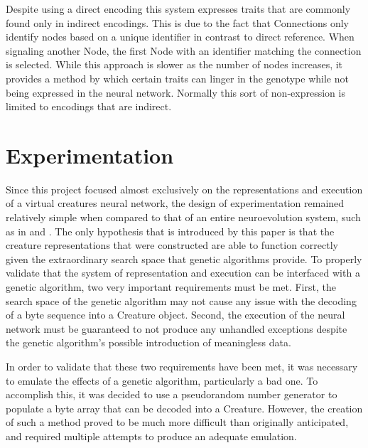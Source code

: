\documentclass[12pt]{article}
\begin{document}
Despite using a direct encoding this system expresses traits that are commonly found only in indirect encodings.
This is due to the fact that Connections only identify nodes based on a unique identifier in contrast to direct reference.
When signaling another Node, the first Node with an identifier matching the connection is selected.
While this approach is slower as the number of nodes increases, it provides a method by which certain traits can linger in the genotype while not being expressed in the neural network.
Normally this sort of non-expression is limited to encodings that are indirect.


\section*{Experimentation}
Since this project focused almost exclusively on the representations and execution of a virtual creatures neural network, the design of experimentation remained relatively simple when compared to that of an entire neuroevolution system, such as in \cite{sims1994evolving} and \cite{lehman2011evolving}.
The only hypothesis that is introduced by this paper is that the creature representations that were constructed are able to function correctly given the extraordinary search space that genetic algorithms provide.
To properly validate that the system of representation and execution can be interfaced with a genetic algorithm, two very important requirements must be met.
First, the search space of the genetic algorithm may not cause any issue with the decoding of a byte sequence into a Creature object.
Second, the execution of the neural network must be guaranteed to not produce any unhandled exceptions despite the genetic algorithm’s possible introduction of meaningless data.

In order to validate that these two requirements have been met, it was necessary to emulate the effects of a genetic algorithm, particularly a bad one.
To accomplish this, it was decided to use a pseudorandom number generator to populate a byte array that can be decoded into a Creature.
However, the creation of such a method proved to be much more difficult than originally anticipated, and required multiple attempts to produce an adequate emulation.
\end{document}
